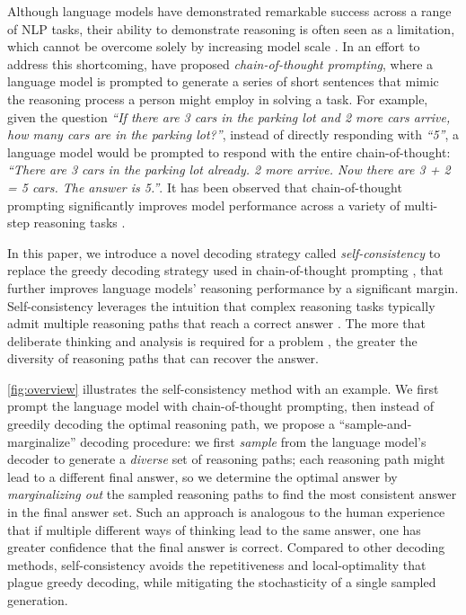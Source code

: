 \documentclass{article} %
\begin{document}
Although language models have demonstrated remarkable success across
a range of NLP tasks, %
their ability to demonstrate reasoning is often seen as a limitation,
which cannot be overcome solely by increasing model scale \citep[][\textit{inter alia}]{rae2021scaling,bigbench}.
In an effort to address this shortcoming, \citet{wei2022chain} have proposed \textit{chain-of-thought prompting}, where a language model is prompted to generate a series of short sentences that mimic the reasoning process
a person might employ in solving a task.
For example, given the question \textit{``If there are 3 cars in the parking lot and 2 more cars arrive, how many cars are in the parking lot?''}, instead of directly responding with \textit{``5''},
a language model would be prompted to respond with the entire chain-of-thought: \textit{``There are 3 cars in the parking lot already. 2 more arrive. Now there are 3 + 2 = 5 cars. The answer is 5.''}. 
It has been observed that chain-of-thought prompting significantly improves model performance across a variety of multi-step reasoning tasks \citep{wei2022chain}.


In this paper, we introduce a novel decoding strategy called \textit{self-consistency} to replace the greedy decoding strategy used in chain-of-thought prompting \citep{wei2022chain}, that further improves language models' reasoning performance by a significant margin.
Self-consistency leverages the intuition that complex reasoning tasks typically admit multiple reasoning paths that reach a correct answer \citep{stanovich2000individual}. 
The more that deliberate thinking and analysis is required for a problem \citep{evans2010intuition}, the greater the diversity of reasoning paths that can recover the answer.

\cref{fig:overview} illustrates the self-consistency method with an example.
We first prompt the language model with chain-of-thought prompting, 
then instead of greedily decoding the optimal reasoning path, we propose a ``sample-and-marginalize'' decoding procedure: we first \textit{sample} from the language model's decoder to generate a \textit{diverse} set of reasoning paths; each reasoning path might lead to a different final answer, so we determine the optimal answer by \textit{marginalizing out} the sampled reasoning paths to find the most consistent answer in the final answer set.
Such an approach is analogous to the human experience that if multiple different ways of thinking lead to the same answer, one has greater confidence that the final answer is correct.
Compared to other decoding methods, self-consistency avoids the repetitiveness and local-optimality that plague greedy decoding, while mitigating the stochasticity of a single  sampled generation.
\end{document}
